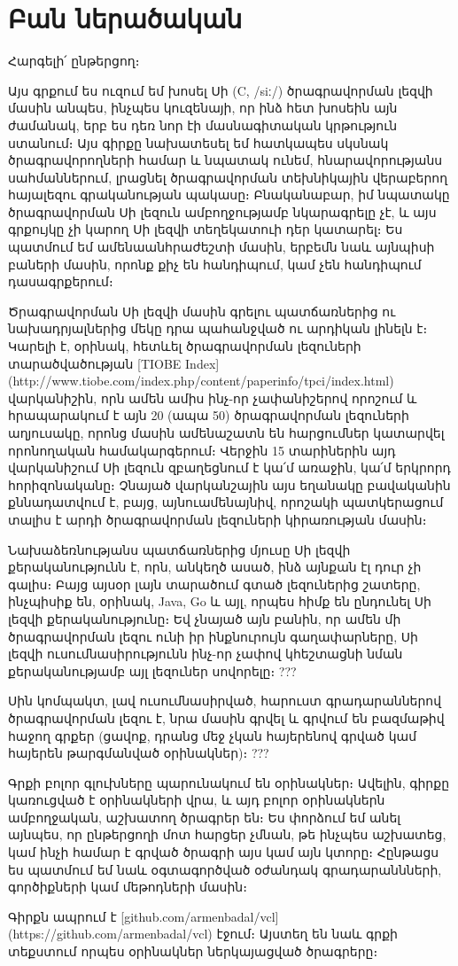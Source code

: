 \chapter*{Բան ներածական}

Հարգելի՛ ընթերցող։

Այս գրքում ես ուզում եմ խոսել Սի (C, /siː/) ծրագրավորման լեզվի մասին անպես, ինչպես կուզենայի, որ ինձ հետ խոսեին այն ժամանակ, երբ ես դեռ նոր էի մասնագիտական կրթություն ստանում։ Այս գիրքը նախատեսել եմ հատկապես սկսնակ ծրագրավորողների համար և նպատակ ունեմ, հնարավորությանս սահմաններում, լրացնել ծրագրավորման տեխնիկային վերաբերող հայալեզու գրականության պակասը։ Բնականաբար, իմ նպատակը ծրագրավորման Սի լեզուն ամբողջությամբ նկարագրելը չէ, և այս գրքույկը չի կարող Սի լեզվի տեղեկատուի դեր կատարել։ Ես պատմում եմ ամենաանհրաժեշտի մասին, երբեմն նաև այնպիսի բաների մասին, որոնք քիչ են հանդիպում, կամ չեն հանդիպում դասագրքերում։

Ծրագրավորման Սի լեզվի մասին գրելու պատճառներից ու նախադրյալներից մեկը դրա պահանջված ու արդիկան լինելն է։ Կարելի է, օրինակ, հետևել ծրագրավորման լեզուների տարածվածության [TIOBE Index](http://www.tiobe.com/index.php/content/paperinfo/tpci/index.html) վարկանիշին, որն ամեն ամիս ինչ-որ չափանիշերով որոշում և հրապարակում է այն 20 (ապա 50) ծրագրավորման լեզուների աղյուսակը, որոնց մասին ամենաշատն են հարցումներ կատարվել որոնողական համակարգերում։ Վերջին 15 տարիներին այդ վարկանիշում Սի լեզուն զբաղեցնում է կա՛մ առաջին, կա՛մ երկրորդ հորիզոնականը։ Չնայած վարկանշային այս եղանակը բավականին քննադատվում է, բայց, այնուամենայնիվ, որոշակի պատկերացում տալիս է արդի ծրագրավորման լեզուների կիրառության մասին։

Նախաձեռնությանս պատճառներից մյուսը Սի լեզվի քերականությունն է, որն, անկեղծ ասած, ինձ այնքան էլ դուր չի գալիս։ Բայց այսօր լայն տարածում գտած լեզուներից շատերը, ինչպիսիք են, օրինակ, Java, Go և այլ, որպես հիմք են ընդունել Սի լեզվի քերականությունը։ Եվ չնայած այն բանին, որ ամեն մի ծրագրավորման լեզու ունի իր ինքնուրույն գաղափարները, Սի լեզվի ուսումնասիրությունն ինչ-որ չափով կհեշտացնի նման քերականությամբ այլ լեզուներ սովորելը։ ???

Սին կոմպակտ, լավ ուսումնասիրված, հարուստ գրադարաններով ծրագրավորման լեզու է, նրա մասին գրվել և գրվում են բազմաթիվ հաջող գրքեր (ցավոք, դրանց մեջ չկան հայերենով գրված կամ հայերեն թարգմանված օրինակներ)։ ???

Գրքի բոլոր գլուխները պարունակում են օրինակներ։ Ավելին, գիրքը կառուցված է օրինակների վրա, և այդ բոլոր օրինակներն ամբողջական, աշխատող ծրագրեր են։ Ես փորձում եմ անել այնպես, որ ընթերցողի մոտ հարցեր չմնան, թե ինչպես աշխատեց, կամ ինչի համար է գրված ծրագրի այս կամ այն կտորը։ Հընթացս ես պատմում եմ նաև օգտագործված օժանդակ գրադարաննների, գործիքների կամ մեթոդների մասին։

Գիրքն ապրում է [github.com/armenbadal/vcl](https://github.com/armenbadal/vcl) էջում։ Այստեղ են նաև գրքի տեքստում որպես օրինակներ ներկայացված ծրագրերը։
